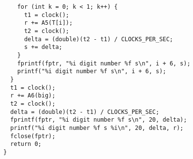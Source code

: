 \begin{verbatim}
    for (int k = 0; k < 1; k++) {
      t1 = clock();
      r += A5(T[i]);
      t2 = clock();
      delta = (double)(t2 - t1) / CLOCKS_PER_SEC;
      s += delta;
    }
    fprintf(fptr, "%i digit number %f s\n", i + 6, s);
    printf("%i digit number %f s\n", i + 6, s);
  }
  t1 = clock();
  r += A6(big);
  t2 = clock();
  delta = (double)(t2 - t1) / CLOCKS_PER_SEC;
  fprintf(fptr, "%i digit number %f s\n", 20, delta);
  printf("%i digit number %f s %i\n", 20, delta, r);
  fclose(fptr);
  return 0;
}
\end{verbatim}